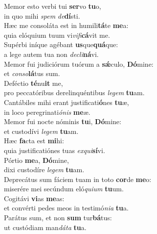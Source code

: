 \oddverse Memor esto verbi tui \textbf{ser}vo \textbf{tu}o,~\*\\
\oddverse in quo mihi \textit{spem} \textit{de}\textbf{dí}sti.\\
\evenverse Hæc me consoláta est in humili\textbf{tá}te \textbf{me}a:~\*\\
\evenverse quia elóquium tuum vi\textit{vi}\textit{fi}\textbf{cá}vit me.\\
\oddverse Supérbi iníque agébant \textbf{us}que\textbf{quá}que:~\*\\
\oddverse a lege autem tua non \textit{de}\textit{cli}\textbf{ná}vi.\\
\evenverse Memor fui judiciórum tuórum a \textbf{sǽ}culo, \textbf{Dó}mine:~\*\\
\evenverse et \textit{con}\textit{so}\textbf{lá}tus sum.\\
\oddverse Deféctio \textbf{té}nu\textbf{it} me,~\*\\
\oddverse pro peccatóribus derelinquéntibus \textit{le}\textit{gem} \textbf{tu}am.\\
\evenverse Cantábiles mihi erant justificati\textbf{ó}nes \textbf{tu}æ,~\*\\
\evenverse in loco peregrinati\textit{ó}\textit{nis} \textbf{me}æ.\\
\oddverse Memor fui nocte nóminis \textbf{tu}i, \textbf{Dó}mine:~\*\\
\oddverse et custodívi \textit{le}\textit{gem} \textbf{tu}am.\\
\evenverse Hæc \textbf{fa}cta est \textbf{mi}hi:~\*\\
\evenverse quia justificatiónes tuas \textit{ex}\textit{qui}\textbf{sí}vi.\\
\oddverse Pórtio \textbf{me}a, \textbf{Dó}mine,~\*\\
\oddverse dixi custodíre \textit{le}\textit{gem} \textbf{tu}am.\\
\evenverse Deprecátus sum fáciem tuam in toto \textbf{cor}de \textbf{me}o:~\*\\
\evenverse miserére mei secúndum eló\textit{qui}\textit{um} \textbf{tu}um.\\
\oddverse Cogitávi \textbf{vi}as \textbf{me}as:~\*\\
\oddverse et convérti pedes meos in testimó\textit{ni}\textit{a} \textbf{tu}a.\\
\evenverse Parátus sum, et non \textbf{sum} tur\textbf{bá}tus:~\*\\
\evenverse ut custódiam man\textit{dá}\textit{ta} \textbf{tu}a.\\
